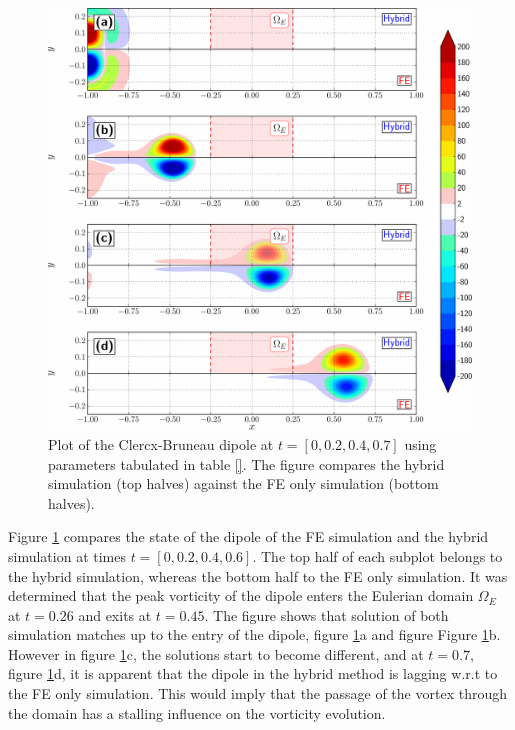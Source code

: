 	\begin{figure}[!b]
	\showthe\columnwidth
	\centering
	\includegraphics[width=\linewidth]{./figures/hybrid/cbConv/hybrid_doubleMonopoleConvection_contourfPlots-crop_compressed.pdf}
	\caption{Plot of the Clercx-Bruneau dipole at $t=[0,0.2,0.4,0.7]$ using parameters tabulated in table \ref{}. The figure compares the hybrid simulation (top halves) against the FE only simulation (bottom halves).}
	\label{fig:hybrid_doubleMonopoleConvection_contourfPlots}
	\end{figure}

Figure \ref{fig:hybrid_doubleMonopoleConvection_contourfPlots} compares the state of the dipole of the FE simulation and the hybrid simulation at times $t=[0,0.2,0.4,0.6]$. The top half of each subplot belongs to the hybrid simulation, whereas the bottom half to the FE only simulation. It was determined that the peak vorticity of the dipole enters the Eulerian domain $\Omega_E$ at $t=0.26$ and exits at $t=0.45$. The figure shows that solution of both simulation matches up to the entry of the dipole, figure \ref{fig:hybrid_doubleMonopoleConvection_contourfPlots}a and figure Figure \ref{fig:hybrid_doubleMonopoleConvection_contourfPlots}b. However in figure \ref{fig:hybrid_doubleMonopoleConvection_contourfPlots}c, the solutions start to become different, and at $t=0.7$, figure \ref{fig:hybrid_doubleMonopoleConvection_contourfPlots}d, it is apparent that the dipole in the hybrid method is lagging w.r.t to the FE only simulation. This would imply that the passage of the vortex through the domain has a stalling influence on the vorticity evolution.

